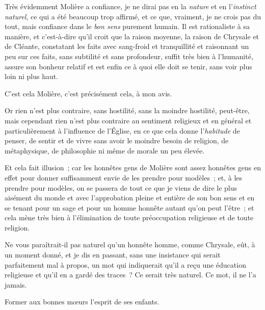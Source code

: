 \documentclass[french,twoside]{book} %
\begin{document}
Très évidemment Molière a confiance, je ne dirai pas en la {\itshape nature} et en l’{\itshape instinct naturel}, ce qui a été beaucoup trop affirmé, et ce que, vraiment, je ne crois pas du tout, mais confiance dans le {\itshape bon sens} purement humain. Il est rationaliste à sa manière, et c’est-à-dire qu’il croit que la raison moyenne, la raison de Chrysale et de Cléante, constatant les faits avec sang-froid et tranquillité et raisonnant un peu sur ces faits, sans subtilité et sans profondeur, suffit très bien à l’humanité, assure son bonheur relatif et est enfin ce à quoi elle doit se tenir, sans voir plus loin ni plus haut.\par
C’est cela Molière, c’est précisément cela, à mon avis.\par
Or rien n’est plus contraire, sans hostilité, sans la moindre hostilité, peut-être, mais cependant rien n’est plus contraire au sentiment religieux et en général et particulièrement à l’influence de  l’Église, en ce que cela donne l’{\itshape habitude} de penser, de sentir et de vivre sans avoir le moindre besoin de religion, de métaphysique, de philosophie ni même de morale un peu élevée.\par
Et cela fait illusion ; car les honnêtes gens de Molière sont assez honnêtes gens en effet pour donner suffisamment envie de les prendre pour modèles ; et, à les prendre pour modèles, on se passera de tout ce que je viens de dire le plus aisément du monde et avec l’approbation pleine et entière de son bon sens et en se tenant pour un sage et pour un homme honnête autant qu’on peut l’être ; et cela mène très bien à l’élimination de toute préoccupation religieuse et de toute religion.\par
Ne vous paraîtrait-il pas naturel qu’un honnête homme, comme Chrysale, eût, à un moment donné, et je dis en passant, sans une insistance qui serait parfaitement mal à propos, un mot qui indiquerait qu’il a reçu une éducation religieuse et qu’il en a gardé des traces ? Ce serait très naturel. Ce mot, il ne l’a jamais.\par

\begin{center}
\noindent Former aux bonnes mœurs l’esprit de ses enfants.\par
\end{center}
\end{document}

